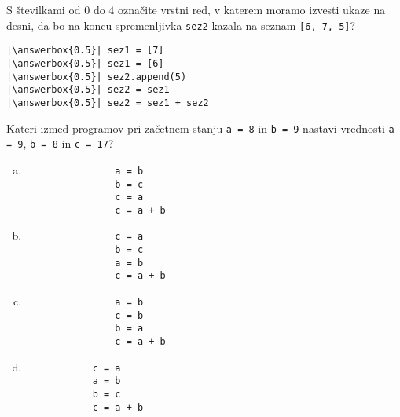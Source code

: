 \documentclass[arhiv, 10pt]{../izpit}
\newcommand{\inlinepy}[1]{\texttt{#1}}
\newcommand{\answerbox}[1]{\framebox{\vphantom{\large M}\hspace{#1cm}}}
\begin{document}
        \naloga*
        \begin{multicols}{2}
        \noindent 
        S številkami od $0$ do $4$ označite vrstni red, v katerem moramo izvesti ukaze na desni, da bo na koncu spremenljivka \inlinepy{sez2} kazala na seznam \inlinepy{[6, 7, 5]}?
    
        \columnbreak
        \noindent
        \begin{verbatim}
|\answerbox{0.5}| sez1 = [7]
|\answerbox{0.5}| sez1 = [6]
|\answerbox{0.5}| sez2.append(5)
|\answerbox{0.5}| sez2 = sez1
|\answerbox{0.5}| sez2 = sez1 + sez2

        \end{verbatim}
        \end{multicols}
    
            
        \naloga*
        
        Kateri izmed programov pri začetnem stanju
            \inlinepy{a = 8} in
            \inlinepy{b = 9}
        nastavi vrednosti
            \inlinepy{a = 9},
            \inlinepy{b = 8} in
            \inlinepy{c = 17}?
    
        \begin{multicols}{4}
        \begin{enumerate}[(a)]
\item 
                \begin{verbatim}
                a = b
                b = c
                c = a
                c = a + b
                \end{verbatim}
            
\item 
                \begin{verbatim}
                c = a
                b = c
                a = b
                c = a + b
                \end{verbatim}
            
\item 
                \begin{verbatim}
                a = b
                c = b
                b = a
                c = a + b
                \end{verbatim}
            
\item 
            \begin{verbatim}
            c = a
            a = b
            b = c
            c = a + b
            \end{verbatim}
        
\end{enumerate}

        \end{multicols}
    
\end{document}
